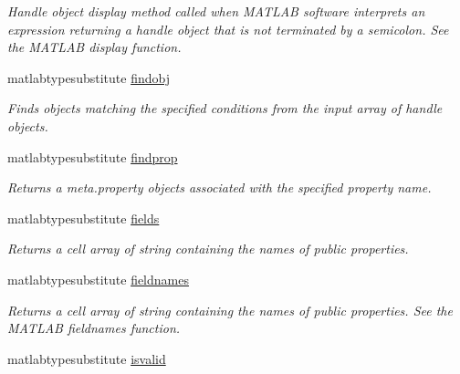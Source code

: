 \begin{DoxyCompactItemize}
\begin{DoxyCompactList}\small\item\em Handle object display method called when M\+A\+T\+L\+A\+B software interprets an expression returning a handle object that is not terminated by a semicolon. See the M\+A\+T\+L\+A\+B display function. \end{DoxyCompactList}\item 
\hypertarget{classhandle_a000398ac90dd973b4618c739e6fd64a9}{}matlabtypesubstitute \hyperlink{classhandle_a000398ac90dd973b4618c739e6fd64a9}{findobj}\label{classhandle_a000398ac90dd973b4618c739e6fd64a9}

\begin{DoxyCompactList}\small\item\em Finds objects matching the specified conditions from the input array of handle objects. \end{DoxyCompactList}\item 
\hypertarget{classhandle_ab4b410e2df940296c9d2563898c951fe}{}matlabtypesubstitute \hyperlink{classhandle_ab4b410e2df940296c9d2563898c951fe}{findprop}\label{classhandle_ab4b410e2df940296c9d2563898c951fe}

\begin{DoxyCompactList}\small\item\em Returns a meta.\+property objects associated with the specified property name. \end{DoxyCompactList}\item 
\hypertarget{classhandle_ad9c0557345e68bd933889c28b2a9484b}{}matlabtypesubstitute \hyperlink{classhandle_ad9c0557345e68bd933889c28b2a9484b}{fields}\label{classhandle_ad9c0557345e68bd933889c28b2a9484b}

\begin{DoxyCompactList}\small\item\em Returns a cell array of string containing the names of public properties. \end{DoxyCompactList}\item 
\hypertarget{classhandle_a7086577f3953d4bd9ce17b07c4f6e141}{}matlabtypesubstitute \hyperlink{classhandle_a7086577f3953d4bd9ce17b07c4f6e141}{fieldnames}\label{classhandle_a7086577f3953d4bd9ce17b07c4f6e141}

\begin{DoxyCompactList}\small\item\em Returns a cell array of string containing the names of public properties. See the M\+A\+T\+L\+A\+B fieldnames function. \end{DoxyCompactList}\item 
\hypertarget{classhandle_a72617e83dc9643b61ed8af63e5058ccf}{}matlabtypesubstitute \hyperlink{classhandle_a72617e83dc9643b61ed8af63e5058ccf}{isvalid}\label{classhandle_a72617e83dc9643b61ed8af63e5058ccf}


\end{DoxyCompactItemize}
